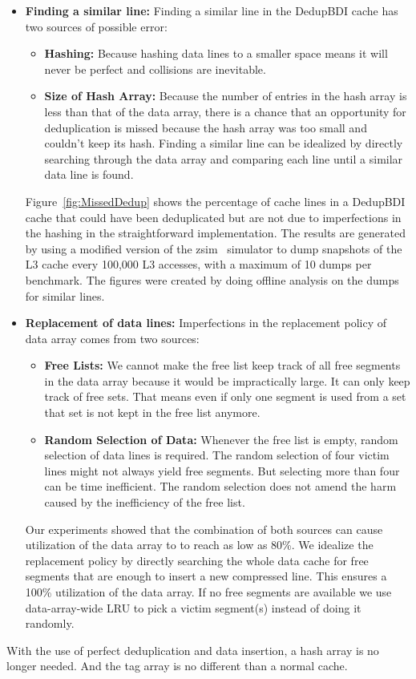 \begin{itemize}
    \item \textbf{Finding a similar line:} Finding a similar line in the DedupBDI cache has two sources of possible error: 
    \begin{itemize}
        \item \textbf{Hashing:} Because hashing data lines to a smaller space means it will never be perfect and collisions are inevitable. 
        \item \textbf{Size of Hash Array:} Because the number of entries in the hash array is less than that of the data array, there is a chance that an opportunity for deduplication is missed because the hash array was too small and couldn't keep its hash. Finding a similar line can be idealized by directly searching through the data array and comparing each line until a similar data line is found.
    \end{itemize}
    Figure~\ref{fig:MissedDedup} shows the percentage of cache lines in a DedupBDI cache that could have been deduplicated but are not due to imperfections in the hashing in the straightforward implementation. The results are generated by using a modified version of the zsim~\cite{zsim} simulator to dump snapshots of the L3 cache every 100,000 L3 accesses, with a maximum of 10 dumps per benchmark. The figures were created by doing offline analysis on the dumps for similar lines.
    \item \textbf{Replacement of data lines:} Imperfections in the replacement policy of data array comes from two sources: 
    \begin{itemize}
        \item \textbf{Free Lists:} We cannot make the free list keep track of all free segments in the data array because it would be impractically large. It can only keep track of free sets. That means even if only one segment is used from a set that set is not kept in the free list anymore.
        \item \textbf{Random Selection of Data:} Whenever the free list is empty, random selection of data lines is required. The random selection of four victim lines might not always yield free segments. But selecting more than four can be time inefficient. The random selection does not amend the harm caused by the inefficiency of the free list.
    \end{itemize}
    Our experiments showed that the combination of both sources can cause utilization of the data array to to reach as low as 80\%. We idealize the replacement policy by directly searching the whole data cache for free segments that are enough to insert a new compressed line. This ensures a 100\% utilization of the data array. If no free segments are available we use data-array-wide LRU to pick a victim segment(s) instead of doing it randomly.
\end{itemize}
With the use of perfect deduplication and data insertion, a hash array is no longer needed. And the tag array is no different than a normal cache.

